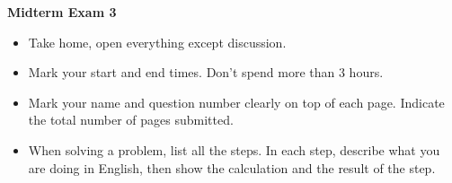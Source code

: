 \usepackage{html}

\begin{center}
{\Large \bf  Midterm Exam 3}
\end{center}

\begin{itemize}
\item Take home, open everything except discussion.
\item Mark your start and end times. Don't spend more than 3 hours.
\item Mark your name and question number clearly on top of each page.
  Indicate the total number of pages submitted.
\item When solving a problem, list all the steps. In each step, describe 
  what you are doing in English, then show the calculation and the 
  result of the step. 
\end{itemize}

